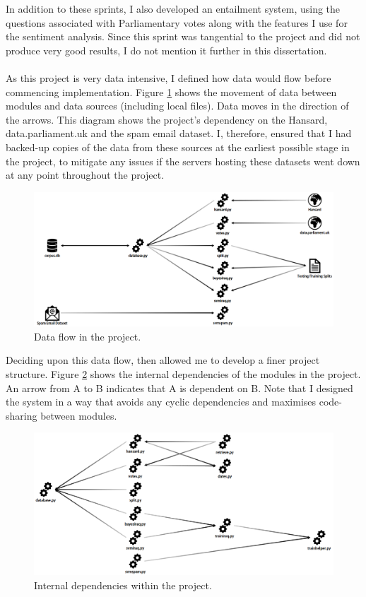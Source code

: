 \documentclass[12pt,a4paper,twoside,openright]{report}
\begin{document}
In addition to these sprints, I also developed an entailment system, using the questions associated with Parliamentary votes along with the features I use for the sentiment analysis. Since this sprint was tangential to the project and did not produce very good results, I do not mention it further in this dissertation.
\\\\
As this project is very data intensive, I defined how data would flow before commencing implementation. Figure \ref{fig:dataflow} shows the movement of data between modules and data sources (including local files). Data moves in the direction of the arrows. This diagram shows the project's dependency on the Hansard, data.parliament.uk and the spam email dataset. I, therefore, ensured that I had backed-up copies of the data from these sources at the earliest possible stage in the project, to mitigate any issues if the servers hosting these datasets went down at any point throughout the project.
\newline
\begin{figure}
	\includegraphics[width=\linewidth]{figs/dataflow3.png}
	\caption{Data flow in the project.}
	\label{fig:dataflow}
\end{figure}

Deciding upon this data flow, then allowed me to develop a finer project structure. Figure \ref{fig:dependencies} shows the internal dependencies of the modules in the project. An arrow from A to B indicates that A is dependent on B. Note that I designed the system in a way that avoids any cyclic dependencies and maximises code-sharing between modules.

\begin{figure}
	\includegraphics[width=\linewidth]{figs/internaldependencies.png}
	\caption{Internal dependencies within the project.}
	\label{fig:dependencies}
\end{figure}
\end{document}
